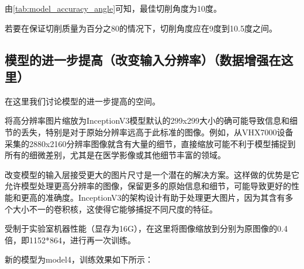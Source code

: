     由\autoref{tab:model_accuracy_angle}可知，最佳切削角度为10度。

    若要在保证切削质量为百分之80的情况下，切削角度应在9度到10.5度之间。


\subsection{模型的进一步提高（改变输入分辨率）（数据增强在这里）}

在这里我们讨论模型的进一步提高的空间。

将高分辨率图片缩放为InceptionV3模型默认的299x299大小的确可能导致信息和细节的丢失，特别是对于原始分辨率远高于此标准的图像。例如，从VHX7000设备采集的2880x2160分辨率图像就含有大量的细节，直接缩放可能不利于模型捕捉到所有的细微差别，尤其是在医学影像或其他细节丰富的领域。

改变模型的输入层接受更大的图片尺寸是一个潜在的解决方案。这样做的优势是它允许模型处理更高分辨率的图像，保留更多的原始信息和细节，可能导致更好的性能和更高的准确度。InceptionV3的架构设计有助于处理更大图片，因为其含有多个大小不一的卷积核，这使得它能够捕捉不同尺度的特征。

受制于实验室机器性能（显存为16G），在这里将图像缩放到分别为原图像的0.4倍，即1152*864，进行再一次训练。

新的模型为model4，训练效果如下所示：


